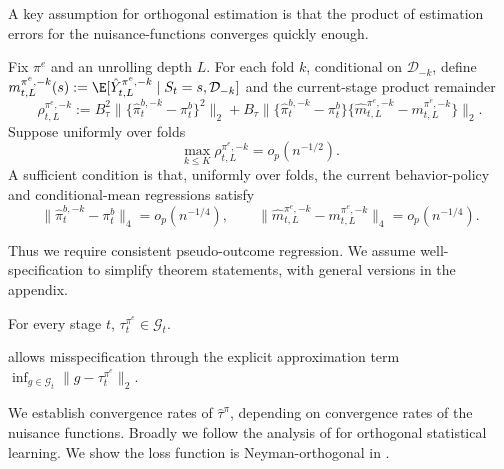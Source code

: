 \documentclass[opre,nonblindrev]{informs4}
\providecommand{\cG}{\mathcal G}
\newcommand{\norm}[1]{\lVert#1\rVert}
\newcommand{\blipadv}{\tau}
\newcommand{\boundadv}{B_\blipadv}
\begin{document}
A key assumption for orthogonal estimation is that the product of estimation errors for the nuisance-functions converges quickly enough. 
\begin{assumption}
\label{asn-producterrorrates}
Fix $\pi^e$ and an unrolling depth $L$. For each fold $k$, conditional on
$\mathcal D_{-k}$, define
$m_{t,L}^{\pi^e,-k}(s):=\E[\hat Y_{t,L}^{\pi^e,-k}\mid
S_t=s,\mathcal D_{-k}]$ and the current-stage product remainder
\begin{equation}
\rho_{t,L}^{\pi^e,-k}
:=\boundadv^2
\norm{\{\hat\pi_t^{b,-k}-\pi_t^b\}^2}_2
+\boundadv
\norm{
\{\hat\pi_t^{b,-k}-\pi_t^b\}
\{\hat m_{t,L}^{\pi^e,-k}-m_{t,L}^{\pi^e,-k}\}
}_2.
\label{eq:diff-rho-L}
\end{equation}
Suppose uniformly over folds
\begin{equation} \textstyle
\max_{k\leq K}\rho_{t,L}^{\pi^e,-k}
=o_p(n^{-1/2}).
\label{eq:diff-current-products}
\end{equation}
A sufficient condition is that, uniformly over folds, the current
behavior-policy and conditional-mean regressions satisfy
\begin{equation*}
\norm{\hat\pi_t^{b,-k}-\pi_t^b}_4=o_p(n^{-1/4}),
\qquad
\norm{\hat m_{t,L}^{\pi^e,-k}-m_{t,L}^{\pi^e,-k}}_4=o_p(n^{-1/4}).
\end{equation*}
\end{assumption}
Thus we require consistent pseudo-outcome regression. We assume
well-specification to simplify theorem statements, with general
versions in the appendix.
\begin{assumption}[Well-specification of $\blipadv$]
\label{asn-wellspecified}
For every stage $t$, $\blipadv_t^{\pi^e}\in\cG_t$.
\end{assumption}
 allows misspecification through
the explicit approximation term
$\inf_{g\in\cG_t}\norm{g-\blipadv_t^{\pi^e}}_2$.

 We establish convergence rates of $\hat\blipadv^\pi$, depending on convergence rates of the nuisance functions. Broadly we follow the analysis of \citep{foster2019orthogonal,lewis2021double} for orthogonal statistical learning. We show the loss function is Neyman-orthogonal in . %
\end{document}
